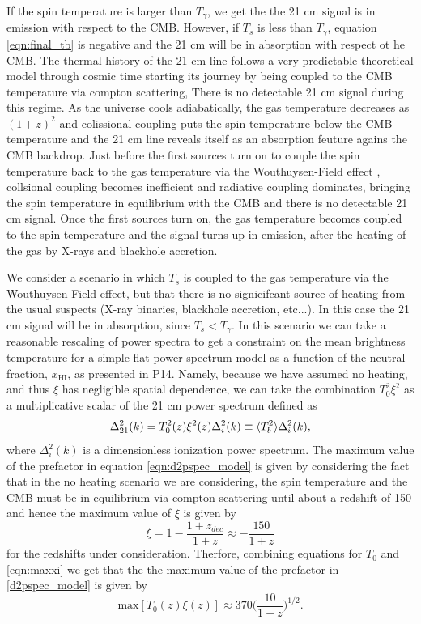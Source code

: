 \documentclass[twocolumn,numberedappendix]{emulateapj} \shorttitle{PSA64}
\begin{document}
If the spin temperature is larger than $T_{\gamma}$, we get the the 21 cm signal is in
emission with respect to the CMB. However, if $T_{s}$ is less than $T_{\gamma}$,
equation \ref{eqn:final_tb} is negative and the 21 cm will be in absorption with
respect ot he CMB.
The thermal history of the 21 cm line follows a very predictable theoretical
model through cosmic time starting its journey by being coupled to the
CMB temperature via compton scattering, There is no detectable 21 cm
signal during this regime. As the universe cools adiabatically, the gas temperature decreases as
$(1+z)^{2}$ and colissional coupling puts the spin temperature below the CMB
temperature and the 21 cm line reveals itself as an absorption feuture agains
the CMB backdrop. Just before the first sources
turn on to couple the spin temperature back to the
gas temperature via the Wouthuysen-Field effect \citep{wouthuysen1952}, collsional coupling becomes
inefficient and radiative coupling dominates, bringing the spin temperature in
equilibrium with the CMB and there is no detectable 21 cm signal.
Once the first sources turn on, the gas temperature
becomes coupled to the spin temperature and the signal turns up in emission,
after the heating of the gas by X-rays and blackhole accretion. 

We consider a scenario in which $T_{s}$ is coupled to the gas temperature via
the Wouthuysen-Field effect, but that there is no signicifcant source of heating
from the usual suspects (X-ray binaries, blackhole accretion, etc...). In this
case the 21 cm  signal will be in absorption, since $T_{s} < T_{\gamma}$.
In this scenario we can take a reasonable rescaling of power spectra to get a
constraint on the mean brightness temperature for a simple flat power spectrum model
as a function of the neutral fraction, $x_{\text{HI}}$, as presented in P14. Namely,
because we have assumed no heating, and thus $\xi$ has negligible spatial
dependence, we can take the combination
$T_{0}^{2}\xi^{2}$ as a multiplicative scalar of the 21 cm power spectrum
defined as 
\begin{equation}\label{eqn:d2pspec_model}
    \Delta^{2}_{21}(k) = T_{0}^{2}(z)\xi^{2}(z)\Delta_{i}^{2}(k)\equiv
\expval{T_{b}^{2}}\Delta_{i}^{2}(k),
\end{equation}
where $\Delta_{i}^{2}(k)$ is a
dimensionless ionization power spectrum. The maximum value of the
prefactor in equation \ref{eqn:d2pspec_model} is given by considering the fact
that in the no heating scenario we are considering, the spin temperature and the
CMB must be in equilibrium via compton scattering until about a redshift of 150
\citep{furlanetto_et_al2006} and hence the maximum value of $\xi$ is given by
\begin{equation}\label{eqn:maxxi}
\xi = 1 -\frac{1+z_{dec}}{1+z} \approx -\frac{150}{1+z} 
\end{equation}
for the redshifts under consideration. Therfore, combining equations for $T_{0}$
and \ref{eqn:maxxi} we get that the the maximum value of the prefactor in
\ref{d2pspec_model} is given by 
\begin{equation}
    \text{max}[T_{0}(z)\xi(z)] \approx 370\big(\frac{10}{1+z}\big)^{1/2}.
\end{equation}
\end{document}
